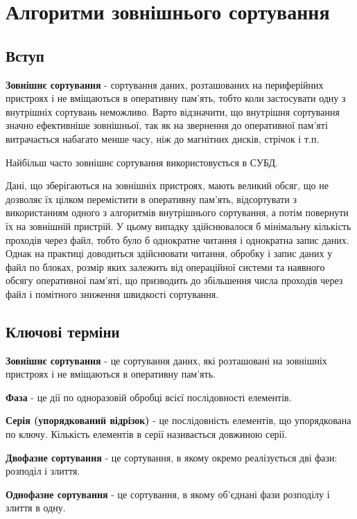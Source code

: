 \chapter{Алгоритми зовнішнього сортування}


\nopagebreak[4]
\section{Вступ}
\nopagebreak[4]
\textbf{Зовнішнє сортування} - сортування даних, розташованих на периферійних пристроях і не вміщаються в оперативну пам'ять, тобто коли застосувати одну з внутрішніх сортувань неможливо. Варто відзначити, що внутрішня сортування значно ефективніше зовнішньої, так як на звернення до оперативної пам'яті витрачається набагато менше часу, ніж до магнітних дисків, стрічок і т.п.

Найбільш часто зовнішнє сортування використовується в СУБД.

Дані, що зберігаються на зовнішніх пристроях, мають великий обсяг, що не дозволяє їх цілком перемістити в оперативну пам'ять, відсортувати з використанням одного з алгоритмів внутрішнього сортування, а потім повернути їх на зовнішній пристрій. У цьому випадку здійснювалося б мінімальну кількість проходів через файл, тобто було б однократне читання і однократна запис даних. Однак на практиці доводиться здійснювати читання, обробку і запис даних у файл по блоках, розмір яких залежить від операційної системи та наявного обсягу оперативної пам'яті, що призводить до збільшення числа проходів через файл і помітного зниження швидкості сортування.

\section{Ключові терміни}
\nopagebreak[4]
\textbf{Зовнішнє сортування} - це сортування даних, які розташовані на зовнішніх пристроях і не вміщаються в оперативну пам'ять.

\textbf{Фаза} - це дії по одноразовій обробці всієї послідовності елементів.

\textbf{Серія (упорядкований відрізок)} - це послідовність елементів, що упорядкована по ключу. Кількість елементів в серії називається довжиною серії.

\textbf{Двофазне сортування} - це сортування, в якому окремо реалізується дві фази: розподіл і злиття. 

\textbf{Однофазне сортування} - це сортування, в якому об'єднані фази розподілу і злиття в одну.

